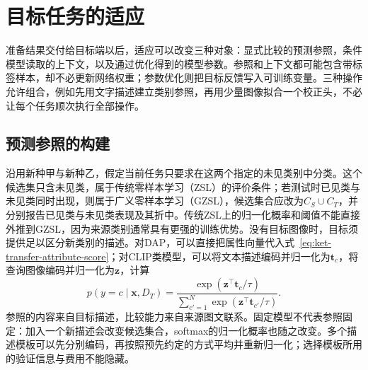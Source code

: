 \section{目标任务的适应}
\label{sec:ket-transfer-adaptation}

准备结果交付给目标端以后，适应可以改变三种对象：显式比较的预测参照，条件模型读取的上下文，以及通过优化得到的模型参数。参照和上下文都可能包含带标签样本，却不必更新网络权重；参数优化则把目标反馈写入可训练变量。三种操作允许组合，例如先用文字描述建立类别参照，再用少量图像拟合一个校正头，不必让每个任务顺次执行全部操作。

\subsection{预测参照的构建}
\label{sec:ket-transfer-references}

沿用新种甲与新种乙，假定当前任务只要求在这两个指定的未见类别中分类。这个候选集只含未见类，属于传统零样本学习（ZSL）的评价条件；若测试时已见类与未见类同时出现，则属于广义零样本学习（GZSL），候选集合应改为$C_S\cup C_T$，并分别报告已见类与未见类表现及其折中。传统ZSL上的归一化概率和阈值不能直接外推到GZSL，因为来源类别通常具有更强的训练优势。没有目标图像时，目标须提供足以区分新类别的描述。对DAP，可以直接把属性向量代入式~\eqref{eq:ket-transfer-attribute-score}；对CLIP类模型，可以将文本描述编码并归一化为$\bm t_c$，将查询图像编码并归一化为$\bm z$，计算
\begin{equation}
  p(y=c\mid\bm x,D_T)
  =\frac{\exp(\bm z^\top\bm t_c/\tau)}
         {\sum_{c'=1}^{N}\exp(\bm z^\top\bm t_{c'}/\tau)}.
  \label{eq:ket-transfer-text-reference}
\end{equation}
参照的内容来自目标描述，比较能力来自来源图文联系。固定模型不代表参照固定：加入一个新描述会改变候选集合，softmax的归一化概率也随之改变。多个描述模板可以先分别编码，再按照预先约定的方式平均并重新归一化；选择模板所用的验证信息与费用不能隐藏。

